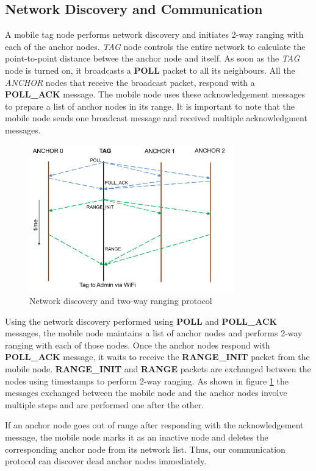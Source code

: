 \documentclass[journal,transmag]{IEEEtran}
\begin{document}
\subsection{Network Discovery and Communication}
A mobile tag node performs network discovery and initiates 2-way ranging with each of the anchor nodes. \textit{TAG} node controls the entire network to calculate the point-to-point distance betwee the anchor node and itself. As soon as the \textit{TAG} node is turned on, it broadcasts a \textbf{POLL} packet to all its neighbours. All the \textit{ANCHOR} nodes that receive the broadcast packet, respond with a \textbf{POLL\_ACK} message. The mobile node uses these acknowledgement messages to prepare a list of anchor nodes in its range. It is important to note that the mobile node sends one broadcast message and received multiple acknowledgment messages.\\  
\begin{figure}[!h]
\centering
\includegraphics[width=3.5in]{communication.png}
\caption{{Network discovery and two-way ranging protocol}}
\label{commsystem}
\end{figure}
Using the network discovery performed using \textbf{POLL} and \textbf{POLL\_ACK} messages, the mobile node maintains a list of anchor nodes and performs 2-way ranging with each of those nodes. Once the anchor nodes respond with \textbf{POLL\_ACK} message, it waits to receive the \textbf{RANGE\_INIT} packet from the mobile node. \textbf{RANGE\_INIT} and \textbf{RANGE} packets are exchanged between the nodes using timestamps to perform 2-way ranging. As shown in figure \ref{commsystem} the messages exchanged between the mobile node and the anchor nodes involve multiple steps and are performed one after the other. 

If an anchor node goes out of range after responding with the acknowledgement message, the mobile node marks it as an inactive node and deletes the corresponding anchor node from its network list. Thus, our communication protocol can discover dead anchor nodes immediately.
\end{document}
